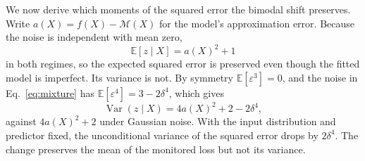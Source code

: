 \documentclass[preprint,12pt]{elsarticle}
\begin{document}
We now derive which moments of the squared error the bimodal shift preserves. Write $a(X)=f(X)-\mathcal M(X)$ for the model's approximation error. Because the noise is independent with mean zero,
\begin{equation}\mathbb E[z\mid X]=a(X)^2+1\end{equation}
in both regimes, so the expected squared error is preserved even though the fitted model is imperfect. Its variance is not. By symmetry $\mathbb E[\varepsilon^3]=0$, and the noise in Eq.~\eqref{eq:mixture} has $\mathbb E[\varepsilon^4]=3-2\delta^4$, which gives
\begin{equation}
\operatorname{Var}(z\mid X)=4a(X)^2+2-2\delta^4,
\end{equation}
against $4a(X)^2+2$ under Gaussian noise. With the input distribution and predictor fixed, the unconditional variance of the squared error drops by $2\delta^4$. The change preserves the mean of the monitored loss but not its variance.
\end{document}
